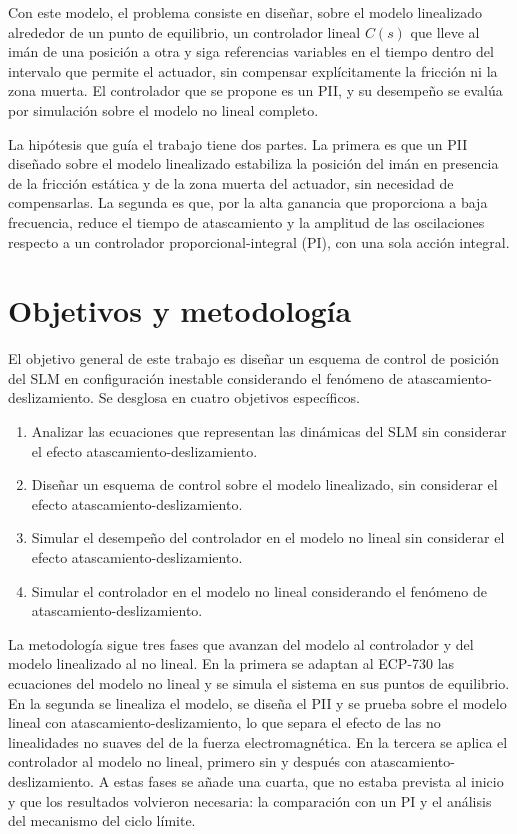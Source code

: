 Con este modelo, el problema consiste en diseñar, sobre el modelo linealizado alrededor de un punto de equilibrio, un controlador lineal $C(s)$ que lleve al imán de una posición a otra y siga referencias variables en el tiempo dentro del intervalo que permite el actuador, sin compensar explícitamente la fricción ni la zona muerta. El controlador que se propone es un PII, y su desempeño se evalúa por simulación sobre el modelo no lineal completo.

La hipótesis que guía el trabajo tiene dos partes. La primera es que un PII diseñado sobre el modelo linealizado estabiliza la posición del imán en presencia de la fricción estática y de la zona muerta del actuador, sin necesidad de compensarlas. La segunda es que, por la alta ganancia que proporciona a baja frecuencia, reduce el tiempo de atascamiento y la amplitud de las oscilaciones respecto a un controlador proporcional-integral (PI), con una sola acción integral.

\section{Objetivos y metodología}\label{sec:objetivos}

El objetivo general de este trabajo es diseñar un esquema de control de posición del SLM en configuración inestable considerando el fenómeno de atascamiento-deslizamiento. Se desglosa en cuatro objetivos específicos.

\begin{enumerate}
  \item Analizar las ecuaciones que representan las dinámicas del SLM sin considerar el efecto atascamiento-deslizamiento.
  \item Diseñar un esquema de control sobre el modelo linealizado, sin considerar el efecto atascamiento-deslizamiento.
  \item Simular el desempeño del controlador en el modelo no lineal sin considerar el efecto atascamiento-deslizamiento.
  \item Simular el controlador en el modelo no lineal considerando el fenómeno de atascamiento-deslizamiento.
\end{enumerate}

La metodología sigue tres fases que avanzan del modelo al controlador y del modelo linealizado al no lineal. En la primera se adaptan al ECP-730 las ecuaciones del modelo no lineal y se simula el sistema en sus puntos de equilibrio. En la segunda se linealiza el modelo, se diseña el PII y se prueba sobre el modelo lineal con atascamiento-deslizamiento, lo que separa el efecto de las no linealidades no suaves del de la fuerza electromagnética. En la tercera se aplica el controlador al modelo no lineal, primero sin y después con atascamiento-deslizamiento. A estas fases se añade una cuarta, que no estaba prevista al inicio y que los resultados volvieron necesaria: la comparación con un PI y el análisis del mecanismo del ciclo límite.

